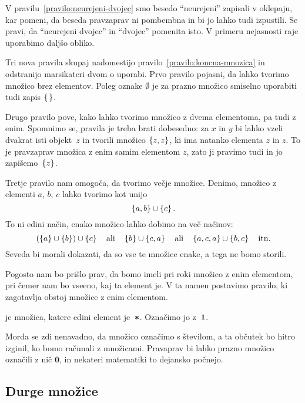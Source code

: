 V pravilu~\ref{pravilo:neurejeni-dvojec} smo besedo ``neurejeni'' zapisali v oklepaju, kar
pomeni, da beseda pravzaprav ni pombembna in bi jo lahko tudi izpustili. Se pravi, da
``neurejeni dvojec'' in ``dvojec'' pomenita isto. V primeru nejasnosti raje uporabimo
daljšo obliko.

Tri nova pravila skupaj nadomestijo pravilo~\ref{pravilo:koncna-mnozica} in odstranijo
marsikateri dvom o uporabi. Prvo pravilo pojasni, da lahko tvorimo množico brez elementov.
Poleg oznake $\emptyset$ je za prazno množico smiselno uporabiti tudi zapis $\set{\,}$.

Drugo pravilo pove, kako lahko tvorimo množico z dvema elementoma, pa tudi z enim.
Spomnimo se, pravila je treba brati dobesedno: za $x$ in $y$ bi lahko vzeli dvakrat isti
objekt~$z$ in tvorili množico $\set{z, z}$, ki ima natanko elementa $z$ in $z$. To je
pravzaprav množica z enim samim elementom $z$, zato ji pravimo tudi  in jo
zapišemo~$\set{z}$.

Tretje pravilo nam omogoča, da tvorimo večje množice. Denimo, množico z elementi $a$, $b$,
$c$ lahko tvorimo kot unijo
%
\begin{equation*}
  \set{a, b} \cup \set{c}.
\end{equation*}
%
To ni edini način, enako množico lahko dobimo na več načinov:
%
\begin{equation*}
  (\set{a} \cup \set{b}) \cup \set{c}
  \quad\text{ali}\quad
  \set{b} \cup \set{c, a}
  \quad\text{ali}\quad
  \set{a,c,a} \cup \set{b,c}
  \quad\text{itn.}
\end{equation*}
%
Seveda bi morali dokazati, da so vse te množice enake, a tega ne bomo storili.

Pogosto nam bo prišlo prav, da bomo imeli pri roki množico z enim elementom, pri čemer nam
bo vseeno, kaj ta element je. V ta namen postavimo pravilo, ki zagotavlja obstoj množice z
enim elementom.

\begin{pravilo}
   je množica, katere edini element je~$\mathord{\boldsymbol{*}}$. Označimo jo z~$\mathtt{\mathbf{1}}$.
\end{pravilo}

Morda se zdi nenavadno, da množico označimo s številom, a ta občutek bo hitro izginil, ko
bomo računali z množicami. Pravaprav bi lahko prazno množico označili z nič $\mathbf{0}$,
in nekateri matematiki to dejansko počnejo.

\subsection{Durge množice}

